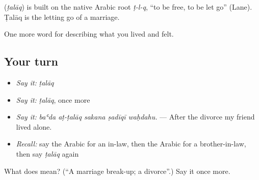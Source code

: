 \begin{cousinweb}
\textbf{} (\emph{ṭalāq}) is built on the native Arabic root \emph{ṭ-l-q}, \textquotedblleft{}to be free, to be let go\textquotedblright{} (Lane). Ṭalāq is the letting go of a marriage.
\end{cousinweb}

\begin{grammarlens}[title={What you've built}]
One more word for describing what you lived and felt.
\end{grammarlens}

\subsection*{Your turn}
\begin{itemize}
\raggedright
  \item \emph{Say it:} \emph{ṭalāq}
  \item \emph{Say it:} \emph{ṭalāq}, once more
  \item \emph{Say it:} \emph{baʿda aṭ-ṭalāq sakana ṣadīqī waḥdahu.} — After the divorce my friend lived alone.
  \item \emph{Recall:} say the Arabic for an in-law, then the Arabic for a brother-in-law, then say \emph{ṭalāq} again
\end{itemize}

\begin{tcolorbox}[breakable,colback=teal!4,colframe=teal!35!black,title={Before you move on}]
What does  mean? (\textquotedblleft{}A marriage break-up; a divorce\textquotedblright{}.) Say it once more.
\end{tcolorbox}
